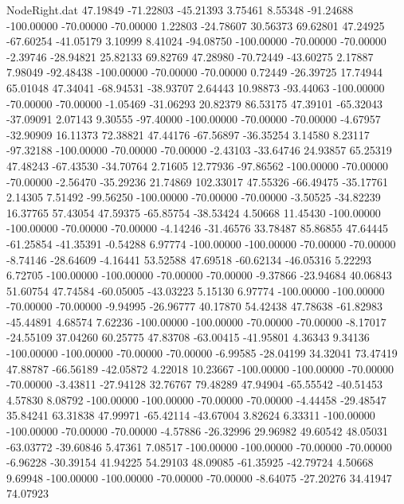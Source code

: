 \begin{filecontents}{NodeRight.dat}
  47.19849  -71.22803  -45.21393     3.75461    8.55348  -91.24688 -100.00000  -70.00000  -70.00000    1.22803  -24.78607   30.56373   69.62801
  47.24925  -67.60254  -41.05179     3.10999    8.41024  -94.08750 -100.00000  -70.00000  -70.00000   -2.39746  -28.94821   25.82133   69.82769
  47.28980  -70.72449  -43.60275     2.17887    7.98049  -92.48438 -100.00000  -70.00000  -70.00000    0.72449  -26.39725   17.74944   65.01048
  47.34041  -68.94531  -38.93707     2.64443   10.98873  -93.44063 -100.00000  -70.00000  -70.00000   -1.05469  -31.06293   20.82379   86.53175
  47.39101  -65.32043  -37.09091     2.07143    9.30555  -97.40000 -100.00000  -70.00000  -70.00000   -4.67957  -32.90909   16.11373   72.38821
  47.44176  -67.56897  -36.35254     3.14580    8.23117  -97.32188 -100.00000  -70.00000  -70.00000   -2.43103  -33.64746   24.93857   65.25319
  47.48243  -67.43530  -34.70764     2.71605   12.77936  -97.86562 -100.00000  -70.00000  -70.00000   -2.56470  -35.29236   21.74869  102.33017
  47.55326  -66.49475  -35.17761     2.14305    7.51492  -99.56250 -100.00000  -70.00000  -70.00000   -3.50525  -34.82239   16.37765   57.43054
  47.59375  -65.85754  -38.53424     4.50668   11.45430 -100.00000 -100.00000  -70.00000  -70.00000   -4.14246  -31.46576   33.78487   85.86855
  47.64445  -61.25854  -41.35391    -0.54288    6.97774 -100.00000 -100.00000  -70.00000  -70.00000   -8.74146  -28.64609   -4.16441   53.52588
  47.69518  -60.62134  -46.05316     5.22293    6.72705 -100.00000 -100.00000  -70.00000  -70.00000   -9.37866  -23.94684   40.06843   51.60754
  47.74584  -60.05005  -43.03223     5.15130    6.97774 -100.00000 -100.00000  -70.00000  -70.00000   -9.94995  -26.96777   40.17870   54.42438
  47.78638  -61.82983  -45.44891     4.68574    7.62236 -100.00000 -100.00000  -70.00000  -70.00000   -8.17017  -24.55109   37.04260   60.25775
  47.83708  -63.00415  -41.95801     4.36343    9.34136 -100.00000 -100.00000  -70.00000  -70.00000   -6.99585  -28.04199   34.32041   73.47419
  47.88787  -66.56189  -42.05872     4.22018   10.23667 -100.00000 -100.00000  -70.00000  -70.00000   -3.43811  -27.94128   32.76767   79.48289
  47.94904  -65.55542  -40.51453     4.57830    8.08792 -100.00000 -100.00000  -70.00000  -70.00000   -4.44458  -29.48547   35.84241   63.31838
  47.99971  -65.42114  -43.67004     3.82624    6.33311 -100.00000 -100.00000  -70.00000  -70.00000   -4.57886  -26.32996   29.96982   49.60542
  48.05031  -63.03772  -39.60846     5.47361    7.08517 -100.00000 -100.00000  -70.00000  -70.00000   -6.96228  -30.39154   41.94225   54.29103
  48.09085  -61.35925  -42.79724     4.50668    9.69948 -100.00000 -100.00000  -70.00000  -70.00000   -8.64075  -27.20276   34.41947   74.07923

\end{filecontents}
